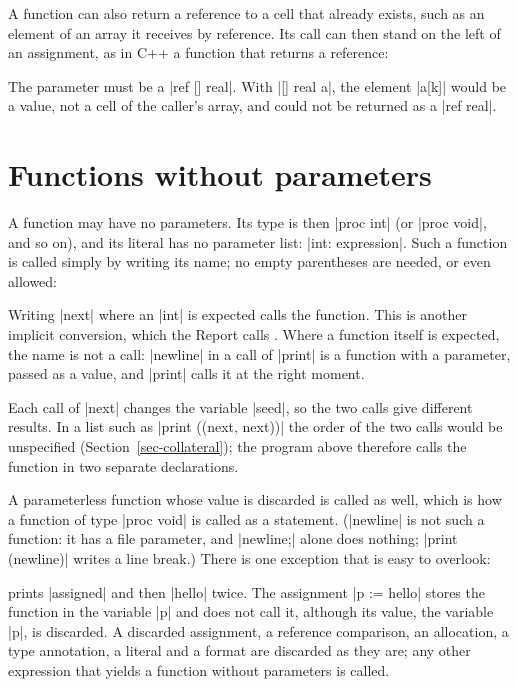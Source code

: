 A function can also return a reference to a cell that already exists,
such as an element of an array it receives by reference. Its call can
then stand on the left of an assignment, as in C++ a function that
returns a reference:


\noindent The parameter must be a \code|ref [] real|. With
\code|[] real a|, the element \code|a[k]| would be a value, not a cell of
the caller's array, and could not be returned as a \code|ref real|.

\section{Functions without parameters}\label{sec-deproc}

A function may have no parameters. Its type is then \code|proc int| (or
\code|proc void|, and so on), and its literal has no parameter list:
\code|int: expression|. Such a function is called simply by writing its
name; no empty parentheses are needed, or even allowed:


Writing \code|next| where an \code|int| is expected calls the function. This
is another implicit conversion, which the Report calls
. Where a function itself is expected, the name is not
a call: \code|newline| in a call of \code|print| is a function with a
parameter, passed as a value, and \code|print| calls it at the right
moment.

Each call of \code|next| changes the variable \code|seed|, so the two
calls give different results. In a list such as
\code|print ((next, next))| the order of the two calls would be
unspecified (Section~\ref{sec-collateral}); the program above therefore
calls the function in two separate declarations.

A parameterless function whose value is discarded is called as well,
which is how a function of type \code|proc void| is called as a
statement. (\code|newline| is not such a function: it has a file
parameter, and \code|newline;| alone does nothing; \code|print (newline)|
writes a line break.) There is one exception that is easy to overlook:


\noindent prints \code|assigned| and then \code|hello| twice. The
assignment \code|p := hello| stores the function in the variable
\code|p| and does not call it, although its value, the variable
\code|p|, is discarded. A discarded assignment, a reference comparison,
an allocation, a type annotation, a literal and a format are discarded
as they are; any other expression that yields a function without parameters is
called.

